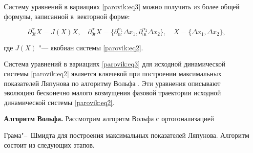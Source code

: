 \smallskip



\begin{remark}

Систему уравнений в вариациях \eqref{parovik:eq3} можно получить из более общей формулы, записанной в~векторной форме: 

$$\partial _{0t}^\alpha X = J( X )X,\quad  

\partial _{0t}^\alpha X = \bigl\{ {\partial _{0t}^{{\alpha _1}}\Delta{x_1},\partial _{0t}^{{\alpha _2}}\Delta {x_2}} \bigr\}, \quad X = \bigl\{ {\Delta{x_1},\Delta {x_2}} \bigr\},$$ 

где $J( X )$ "--- якобиан системы \eqref{parovik:eq2}.

\end{remark}



\smallskip



Система уравнений в вариациях \eqref{parovik:eq3} для исходной динамической системы \eqref{parovik:eq2} является ключевой при построении максимальных показателей Ляпунова по алгоритму Вольфа \cite{parovik:9}. Эти уравнения описывают эволюцию бесконечно малого возмущения фазовой траектории исходной динамической системы \eqref{parovik:eq2}.



\smallskip



\textbf{Алгоритм Вольфа.} Рассмотрим алгоритм Вольфа с ортогонализацией

Грама"--~Шмидта для построения максимальных показателей Ляпунова. Алгоритм состоит из следующих этапов.

